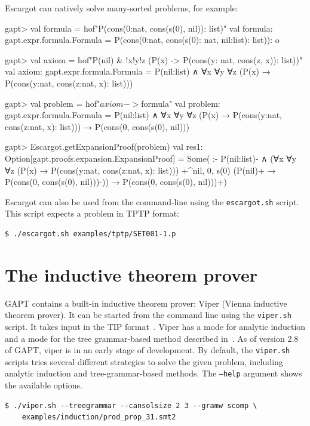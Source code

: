 \documentclass[a4paper,11pt]{book}
\newcommand{\cli}[1]{{\ttfamily {#1}}}
\begin{document}
Escargot can natively solve many-sorted problems, for example:
\begin{clilisting}
gapt> val formula = hof"P(cons(0:nat, cons(s(0), nil)): list)"
val formula: gapt.expr.formula.Formula = P(cons(0:nat, cons(s(0): nat, nil:list): list)): o

gapt> val axiom = hof"P(nil) & !x!y!z (P(x) -> P(cons(y: nat, cons(z, x)): list))"
val axiom: gapt.expr.formula.Formula = P(nil:list) ∧ ∀x ∀y ∀z (P(x) → P(cons(y:nat, cons(z:nat, x): list)))

gapt> val problem = hof"$axiom -> $formula"
val problem: gapt.expr.formula.Formula =
P(nil:list) ∧ ∀x ∀y ∀z (P(x) → P(cons(y:nat, cons(z:nat, x): list))) →
  P(cons(0, cons(s(0), nil)))

gapt> Escargot.getExpansionProof(problem)
val res1: Option[gapt.proofs.expansion.ExpansionProof] =
Some(
:-
P(nil:list)- ∧
    (∀x ∀y ∀z (P(x) → P(cons(y:nat, cons(z:nat, x): list)))
      +^{nil, 0, s(0)} (P(nil)+ → P(cons(0, cons(s(0), nil)))-)) →
  P(cons(0, cons(s(0), nil)))+)

\end{clilisting}


Escargot can also be used from the command-line using the \texttt{escargot.sh}
script.  This script expects a problem in TPTP format:
\begin{lstlisting}
$ ./escargot.sh examples/tptp/SET001-1.p
\end{lstlisting}

\section{The inductive theorem prover \cli{viper}}

GAPT contains a built-in inductive theorem prover: Viper (Vienna inductive theorem prover). It
can be started from the command line using the \texttt{viper.sh} script. It takes input in the
TIP format~\cite{Claessen15TIP}. Viper has a mode for analytic induction and a mode for 
the tree grammar-based method described in~\cite{Eberhard15Inductive}. As of version 2.8 of GAPT,
viper is in an early stage of development.  By default, the \texttt{viper.sh}
scripts tries several different strategies to solve the given problem,
including analytic induction and tree-grammar-based methods.  The
\texttt{--help} argument shows the available options.
\begin{lstlisting}
$ ./viper.sh --treegrammar --cansolsize 2 3 --gramw scomp \
    examples/induction/prod_prop_31.smt2
\end{lstlisting}
\end{document}
